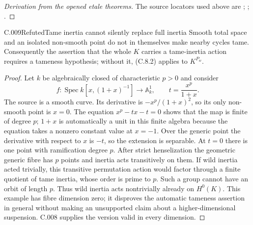 \begin{proof}[Derivation from the opened etale theorems]
The source locators used above are \cite[I, 2.7.1--2.7.3]{C-sga7i}; \cite[XIII, 1.4 and 2.4]{C-sga7ii}; \cite[Theorem~4.2 and (4.3.6), pp.~45--46]{C-illusie1994}.
\end{proof}

\begin{saresult}{C.009}{Refuted}{Tame inertia cannot silently replace full inertia}
Smooth total space and an isolated non-smooth point do not in themselves
make nearby cycles tame. Consequently the assertion that the whole
$K$ carries a tame-inertia action requires a tameness hypothesis;
without it, (C.8.2) applies to $K^{P_w}$.
\end{saresult}
\begin{proof}
Let $k$ be algebraically closed of characteristic $p>0$ and consider
\[
 f:\operatorname{Spec}k[x,(1+x)^{-1}]\longrightarrow\mathbb A^1_k,
 \qquad t=\frac{x^p}{1+x}.
\]
The source is a smooth curve. Its derivative is
$-x^p/(1+x)^2$, so its only non-smooth point is $x=0$.
The equation $x^p-tx-t=0$ shows that the map is finite of degree $p$;
$1+x$ is automatically a unit in this finite algebra because the
equation takes a nonzero constant value at $x=-1$.
Over the generic point the derivative with respect to $x$ is $-t$,
so the extension is separable. At $t=0$ there is one point with
ramification degree $p$. After strict henselization the geometric
generic fibre has $p$ points and inertia acts transitively on them.
If wild inertia acted trivially, this transitive permutation action
would factor through a finite quotient of tame inertia, whose order is
prime to $p$. Such a group cannot have an orbit of length $p$.
Thus wild inertia acts nontrivially already on $H^0(K)$.
This example has fibre dimension zero; it disproves the automatic
tameness assertion in general without making an unsupported claim
about a higher-dimensional suspension. C.008 supplies the version
valid in every dimension.
\end{proof}

